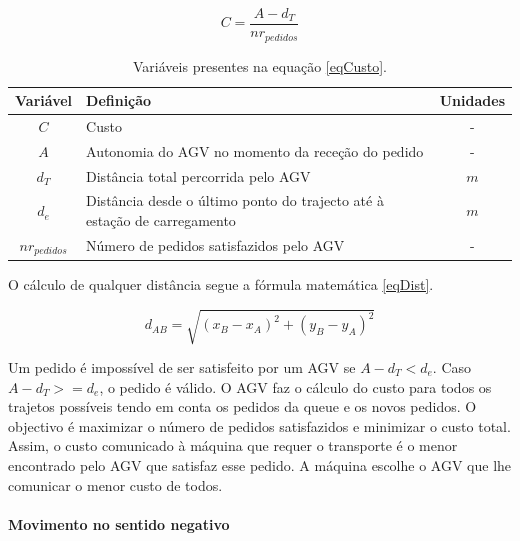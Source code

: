 \begin{titlepage}
\begin{equation}
C = \frac{A-d_{T}}{nr_{pedidos}}
\label{eqCusto}
\end{equation}

\begin{table}[H]
\centering
\caption{Variáveis presentes na equação \ref{eqCusto}.}
\label{my-label}
\begin{tabular}{@{}p{2cm}ll@{}}
\toprule
\multicolumn{1}{c}{\textbf{Variável}} & \textbf{Definição}   & \multicolumn{1}{c}{\textbf{Unidades}} \\ \midrule
\multicolumn{1}{c}{$C$} & Custo &  \multicolumn{1}{c}{-}  \\ \midrule
\multicolumn{1}{c}{$A$} & Autonomia do AGV no momento da receção do pedido &  \multicolumn{1}{c}{-}  \\ \midrule
\multicolumn{1}{c}{$d_{T}$} & Distância total percorrida pelo AGV   & \multicolumn{1}{c}{$m$} \\ \midrule
\multicolumn{1}{c}{$d_{e}$} & Distância desde o último ponto do trajecto até à estação de carregamento & \multicolumn{1}{c}{$m$} \\ \midrule
\multicolumn{1}{c}{$nr_{pedidos}$} & Número de pedidos satisfazidos pelo AGV  & \multicolumn{1}{c}{-} \\ \bottomrule
\end{tabular}
\end{table}

O cálculo de qualquer distância segue a fórmula matemática \ref{eqDist}.

\begin{equation}
d_{AB} = \sqrt{(x_{B}-x_{A})^{2}+(y_{B}-y_{A})^{2}}
\label{eqDist}
\end{equation}\newline

Um pedido é impossível de ser satisfeito por um AGV se $A-d_{T} < d_{e}$. Caso $A-d_{T} >= d_{e}$, o pedido é válido. O AGV faz o cálculo do custo para todos os trajetos possíveis tendo em conta os pedidos da queue e os novos pedidos. O objectivo é maximizar o número de pedidos satisfazidos e minimizar o custo total. Assim, o custo comunicado à máquina que requer o transporte é o menor encontrado pelo AGV que satisfaz esse pedido. A máquina escolhe o AGV que lhe comunicar o menor custo de todos.

\paragraph{Movimento no sentido negativo}


\end{titlepage}
